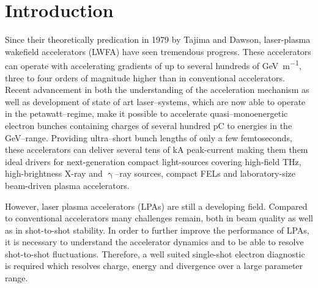 \documentclass[%
reprint,
amsmath,
amssymb,
aip,
rsi, 
numerical,
floatfix,
]{revtex4-1}
\newcommand{\myCite}[1]{\textcolor{blue}{\cite{#1}}}
\begin{document}
\maketitle



\section{\label{Mot} Introduction}

Since their theoretically predication in 1979 by Tajima and Dawson\myCite{Tajima1979}, laser-plasma wakefield accelerators (LWFA) have seen tremendous progress. 
These accelerators can operate with accelerating gradients of up to several hundreds of \si{\giga\electronvolt\per\meter}, three to four orders of magnitude higher than in conventional accelerators.  
Recent advancement in both the understanding of the acceleration mechanism as well as development of state of art laser--systems, which are now able to operate in the petawatt--regime\myCite{Schramm2017, Gaul2010}, make it possible to accelerate quasi--monoenergetic\myCite{Geddes2004, Faure2004, Mangles2004} electron bunches containing charges of several hundred \si{\pico\coulomb} to energies in the \si{\giga\electronvolt}--range\myCite{Leemans2014, Schroeder2007, Wang2013}.
Providing ultra--short bunch lengths of only a few femtoseconds, these accelerators can deliver several tens of kA peak-current \myCite{Couperus2017, Li2017} making them them ideal drivers for next-generation compact light-sources covering high-field THz\myCite{Leemans2003,Green2016}, high-brightness X-ray\myCite{Jochmann2013,Powers2014} and $\upgamma$--ray\myCite{TaPhuoc2012,Sarri2014} sources, compact FELs\myCite{Schlenvoigt2007,Fuchs2009,Maier2012,Huang2012,Steiniger2014} and laboratory-size beam-driven plasma accelerators\myCite{MartinezDelaOssa2013,MartinezDeLaOssa2015}.

However, laser plasma accelerators (LPAs) are still a developing field. 
Compared to conventional accelerators many challenges remain, both in beam quality as well as in shot-to-shot stability.
In order to further improve the performance of LPAs, it is necessary to understand the accelerator dynamics and to be able to resolve shot-to-shot fluctuations. 
Therefore, a well suited single-shot electron diagnostic is required which resolves charge, energy and divergence over a large parameter range. 
\end{document}
